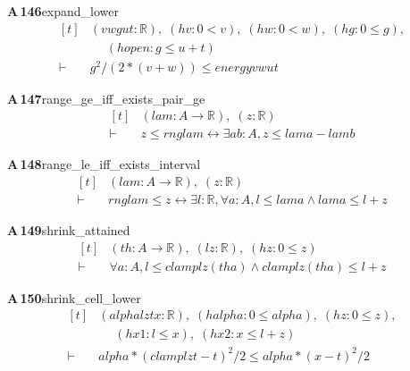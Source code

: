 \documentclass[conference]{IEEEtran}
\theoremstyle{definition}
\newcommand{\lean}[1]{\textsf{\footnotesize #1}}
\begin{document}
\noindent\textbf{A\,146}\quad\lean{expand\_lower}
{\footnotesize\[ \begin{aligned}[t]
&(\mathit{v} \mathit{w} \mathit{g} \mathit{u} \mathit{t} : \mathbb{R} ),\; (\mathit{hv} : 0 < \mathit{v}),\; (\mathit{hw} : 0 < \mathit{w}),\; (\mathit{hg} : 0 \leq \mathit{g}),\\
&\quad \; (\mathit{hopen} : \mathit{g} \leq \mathit{u} + \mathit{t})\\
\vdash\;&\mathit{g} ^{2} / (2 * (\mathit{v} + \mathit{w})) \leq \mathit{energy} \mathit{v} \mathit{w} \mathit{u} \mathit{t}
\end{aligned} \]}

\noindent\textbf{A\,147}\quad\lean{range\_ge\_iff\_exists\_pair\_ge}
{\footnotesize\[ \begin{aligned}[t]
&(\mathit{lam} : \mathit{A} \to \mathbb{R} ),\; (\mathit{z} : \mathbb{R} )\\
\vdash\;&\mathit{z} \leq \mathit{rng} \mathit{lam} \leftrightarrow \exists \mathit{a} \mathit{b} : \mathit{A}, \mathit{z} \leq \mathit{lam} \mathit{a} - \mathit{lam} \mathit{b}
\end{aligned} \]}

\noindent\textbf{A\,148}\quad\lean{range\_le\_iff\_exists\_interval}
{\footnotesize\[ \begin{aligned}[t]
&(\mathit{lam} : \mathit{A} \to \mathbb{R} ),\; (\mathit{z} : \mathbb{R} )\\
\vdash\;&\mathit{rng} \mathit{lam} \leq \mathit{z} \leftrightarrow \exists \mathit{l} : \mathbb{R} , \forall \mathit{a} : \mathit{A}, \mathit{l} \leq \mathit{lam} \mathit{a} \wedge \mathit{lam} \mathit{a} \leq \mathit{l} + \mathit{z}
\end{aligned} \]}

\noindent\textbf{A\,149}\quad\lean{shrink\_attained}
{\footnotesize\[ \begin{aligned}[t]
&(\mathit{th} : \mathit{A} \to \mathbb{R} ),\; (\mathit{l} \mathit{z} : \mathbb{R} ),\; (\mathit{hz} : 0 \leq \mathit{z})\\
\vdash\;&\forall \mathit{a} : \mathit{A}, \mathit{l} \leq \mathit{clamp} \mathit{l} \mathit{z} (\mathit{th} \mathit{a}) \wedge \mathit{clamp} \mathit{l} \mathit{z} (\mathit{th} \mathit{a}) \leq \mathit{l} + \mathit{z}
\end{aligned} \]}

\noindent\textbf{A\,150}\quad\lean{shrink\_cell\_lower}
{\footnotesize\[ \begin{aligned}[t]
&(\mathit{alpha} \mathit{l} \mathit{z} \mathit{t} \mathit{x} : \mathbb{R} ),\; (\mathit{halpha} : 0 \leq \mathit{alpha}),\; (\mathit{hz} : 0 \leq \mathit{z}),\\
&\quad \; (\mathit{hx1} : \mathit{l} \leq \mathit{x}),\; (\mathit{hx2} : \mathit{x} \leq \mathit{l} + \mathit{z})\\
\vdash\;&\mathit{alpha} * (\mathit{clamp} \mathit{l} \mathit{z} \mathit{t} - \mathit{t}) ^{2} / 2 \leq \mathit{alpha} * (\mathit{x} - \mathit{t}) ^{2} / 2
\end{aligned} \]}
\end{document}
